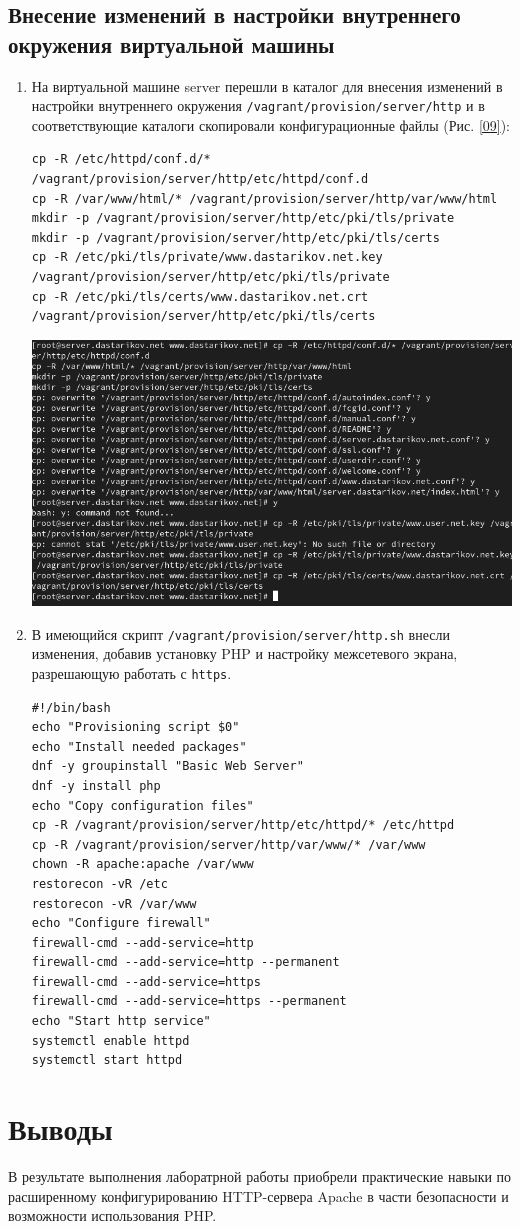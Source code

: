 \subsection{Внесение изменений в настройки внутреннего окружения виртуальной машины}
\begin{enumerate}
\item На виртуальной машине server перешли в каталог для внесения изменений в настройки внутреннего окружения \texttt{/vagrant/provision/server/http} и в соответствующие каталоги скопировали конфигурационные файлы (Рис. \ref{09}):
\begin{verbatim}
cp -R /etc/httpd/conf.d/* /vagrant/provision/server/http/etc/httpd/conf.d
cp -R /var/www/html/* /vagrant/provision/server/http/var/www/html
mkdir -p /vagrant/provision/server/http/etc/pki/tls/private
mkdir -p /vagrant/provision/server/http/etc/pki/tls/certs
cp -R /etc/pki/tls/private/www.dastarikov.net.key /vagrant/provision/server/http/etc/pki/tls/private
cp -R /etc/pki/tls/certs/www.dastarikov.net.crt /vagrant/provision/server/http/etc/pki/tls/certs
\end{verbatim}

\begin{center}
    \centering
    \includegraphics[width=\textwidth]{../images/image09.png}
    \label{09}
\end{center}

\item В имеющийся скрипт \texttt{/vagrant/provision/server/http.sh} внесли изменения, добавив установку PHP и настройку межсетевого экрана, разрешающую работать с \texttt{https}.
  \begin{verbatim}
#!/bin/bash
echo "Provisioning script $0"
echo "Install needed packages"
dnf -y groupinstall "Basic Web Server"
dnf -y install php
echo "Copy configuration files"
cp -R /vagrant/provision/server/http/etc/httpd/* /etc/httpd
cp -R /vagrant/provision/server/http/var/www/* /var/www
chown -R apache:apache /var/www
restorecon -vR /etc
restorecon -vR /var/www
echo "Configure firewall"
firewall-cmd --add-service=http
firewall-cmd --add-service=http --permanent
firewall-cmd --add-service=https
firewall-cmd --add-service=https --permanent
echo "Start http service"
systemctl enable httpd
systemctl start httpd
  \end{verbatim}
\end{enumerate}
\section{Выводы}
В результате выполнения лаборатрной работы приобрели практические навыки по расширенному конфигурированию HTTP-сервера Apache в части безопасности и возможности использования PHP.

